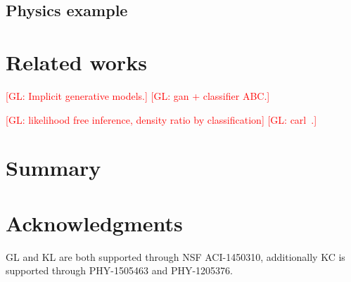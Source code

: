 \documentclass[twocolumn,superscriptaddress,aps]{revtex4-1}
\newcommand{\glnote}[1]{\textcolor{red}{[GL: #1]}}
\theoremstyle{plain}
\begin{document}
\subsection{Physics example}



\section{Related works}


\glnote{Implicit generative models.}
\glnote{gan + classifier ABC.}

\glnote{likelihood free inference, density ratio by classification}
\glnote{carl~\citep{cranmer2015approximating}.}





\section{Summary}




\section*{Acknowledgments}

GL and KL are both supported through NSF ACI-1450310, additionally KC is
supported through PHY-1505463 and PHY-1205376.





\end{document}
